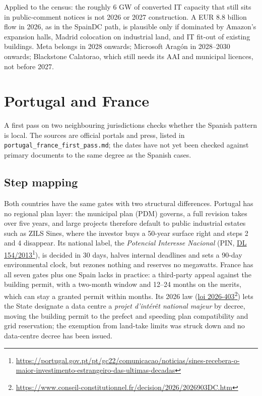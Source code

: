 \documentclass[11pt]{article}
\newcommand{\src}[2]{\href{#1}{#2}\footnote{\url{#1}}}
\begin{document}
Applied to the census: the roughly 6 GW of converted IT capacity that still sits in public-comment notices is not 2026 or 2027 construction. A EUR 8.8 billion flow in 2026, as in the SpainDC path, is plausible only if dominated by Amazon's expansion halls, Madrid colocation on industrial land, and IT fit-out of existing buildings. Meta belongs in 2028 onwards; Microsoft Aragón in 2028--2030 onwards; Blackstone Calatorao, which still needs its AAI and municipal licences, not before 2027.

\section{Portugal and France}

A first pass on two neighbouring jurisdictions checks whether the Spanish pattern is local. The sources are official portals and press, listed in \texttt{portugal\_france\_first\_pass.md}; the dates have not yet been checked against primary documents to the same degree as the Spanish cases.

\subsection{Step mapping}

Both countries have the same gates with two structural differences. Portugal has no regional plan layer: the municipal plan (PDM) governs, a full revision takes over five years, and large projects therefore default to public industrial estates such as ZILS Sines, where the investor buys a 50-year surface right and steps 2 and 4 disappear. Its national label, the \emph{Potencial Interesse Nacional} (PIN, \src{https://portugal.gov.pt/pt/gc22/comunicacao/noticias/sines-recebera-o-maior-investimento-estrangeiro-das-ultimas-decadas}{DL 154/2013}), is decided in 30 days, halves internal deadlines and sets a 90-day environmental clock, but rezones nothing and reserves no megawatts. France has all seven gates plus one Spain lacks in practice: a third-party appeal against the building permit, with a two-month window and 12--24 months on the merits, which can stay a granted permit within months. Its 2026 law (\src{https://www.conseil-constitutionnel.fr/decision/2026/2026903DC.htm}{loi 2026-403}) lets the State designate a data centre a \emph{projet d'intérêt national majeur} by decree, moving the building permit to the prefect and speeding plan compatibility and grid reservation; the exemption from land-take limits was struck down and no data-centre decree has been issued.
\end{document}
